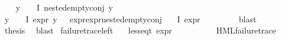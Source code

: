 \begin{isabellebody}
\ \ \isamarkupfalse%
\ {\isachardoublequoteopen}{\isacharparenleft}{\kern0pt}{\isasymforall}y\ {\isasymin}\ {\isacharparenleft}{\kern0pt}{\isasymPhi}\ {\isacharbackquote}{\kern0pt}\ I{\isacharparenright}{\kern0pt}{\isachardot}{\kern0pt}\ nested{\isacharunderscore}{\kern0pt}empty{\isacharunderscore}{\kern0pt}conj\ y{\isacharparenright}{\kern0pt}{\isachardoublequoteclose}\isanewline
\ \ \ \ \isamarkupfalse%
\ {\isacartoucheopen}{\isacharparenleft}{\kern0pt}{\isasymforall}y\ {\isasymin}\ {\isacharparenleft}{\kern0pt}{\isasymPhi}\ {\isacharbackquote}{\kern0pt}\ I{\isacharparenright}{\kern0pt}{\isachardot}{\kern0pt}\ expr{\isacharunderscore}{\kern0pt}{}\ y\ {\isasymle}\ {}{\isacharparenright}{\kern0pt}{\isacartoucheclose}\ expr{\isacharunderscore}{\kern0pt}{}{\isacharunderscore}{\kern0pt}{}{\isacharunderscore}{\kern0pt}expr{\isacharunderscore}{\kern0pt}{}{\isacharunderscore}{\kern0pt}{}{\isacharunderscore}{\kern0pt}nested{\isacharunderscore}{\kern0pt}empty{\isacharunderscore}{\kern0pt}conj\ \isanewline
{\isacartoucheopen}{\isasymforall}{\isasympsi}{\isasymin}{\isasymPhi}\ {\isacharbackquote}{\kern0pt}\ I{\isachardot}{\kern0pt}\ expr{\isacharunderscore}{\kern0pt}{}\ {\isasympsi}\ {\isasymle}\ {}{\isacartoucheclose}\isanewline
\ \ \ \ \isamarkupfalse%
\ blast\isanewline
\ \ \isamarkupfalse%
\ \isamarkupfalse%
\ {\isacharquery}{\kern0pt}thesis\ \isamarkupfalse%
\ blast\isanewline
{}\isamarkupfalse%
%
\endisatagproof
{\isafoldproof}%
%
\isadelimproof
\isanewline
%
\endisadelimproof
\isanewline
{}\isamarkupfalse%
\ failure{\isacharunderscore}{\kern0pt}trace{\isacharunderscore}{\kern0pt}left{\isacharcolon}{\kern0pt}\isanewline
\ \ \ {\isachardoublequoteopen}{\isacharparenleft}{\kern0pt}less{\isacharunderscore}{\kern0pt}eq{\isacharunderscore}{\kern0pt}t\ {\isacharparenleft}{\kern0pt}expr\ {\isasymphi}{\isacharparenright}{\kern0pt}\ {\isacharparenleft}{\kern0pt}{\isasyminfinity}{\isacharcomma}{\kern0pt}\ {\isasyminfinity}{\isacharcomma}{\kern0pt}\ {\isasyminfinity}{\isacharcomma}{\kern0pt}\ {}{\isacharcomma}{\kern0pt}\ {}{\isacharcomma}{\kern0pt}\ {}{\isacharparenright}{\kern0pt}{\isacharparenright}{\kern0pt}{\isachardoublequoteclose}\isanewline
\ \ \ {\isachardoublequoteopen}{\isacharparenleft}{\kern0pt}HML{\isacharunderscore}{\kern0pt}failure{\isacharunderscore}{\kern0pt}trace\ {\isasymphi}{\isacharparenright}{\kern0pt}{\isachardoublequoteclose}\isanewline

\end{isabellebody}
